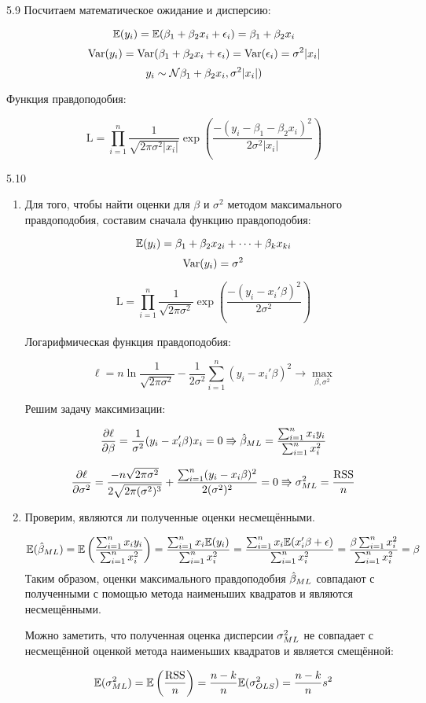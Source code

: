 \protect \hypertarget {soln:5.9}{}
\begin{solution}{{5.9}}
Посчитаем математическое ожидание и дисперсию:

\[\mathbb{E}(y_i) = \mathbb{E}(\beta_1 + \beta_2x_i + \epsilon_i) = \beta_1 + \beta_2x_i\]
\[\operatorname{Var}(y_i)= \operatorname{Var}(\beta_1 + \beta_2x_i + \epsilon_i) = \operatorname{Var}(\epsilon_i) = \sigma^2|x_i|\]
\[y_i \sim \mathcal{N}\beta_1 + \beta_2x_i, \sigma^2|x_i|)\]

Функция правдоподобия:

\[\text{L} = \prod_{i=1}^{n} \frac{1}{\sqrt{2\pi \sigma^2|x_i|}}\exp\left( \frac{-(y_i - \beta_1 - \beta_2x_i)^2}{2\sigma^2|x_i|}\right) \]
\end{solution}
\protect \hypertarget {soln:5.10}{}
\begin{solution}{{5.10}}
\begin{enumerate}
\item Для того, чтобы найти оценки для $\beta$ и $\sigma^2$ методом максимального правдоподобия, составим сначала функцию правдоподобия:

\[\mathbb{E}(y_i) = \beta_1 + \beta_2x_{2i}+\dots+\beta_kx_{ki}\]
\[\operatorname{Var}(y_i) = \sigma^2\]

\[\text{L} = \prod_{i=1}^{n} \frac{1}{\sqrt{2\pi \sigma^2}}\exp\left( \frac{-(y_i - x_i'\beta)^2}{2\sigma^2}\right) \]

Логарифмическая функция правдоподобия:

\[\ell = n \ln \frac{1}{\sqrt{2\pi\sigma^2}} - \frac{1}{2\sigma^2} \sum_{i=1}^{n} (y_i - x_i'\beta)^2 \to \max_{\beta, \sigma^2}\]

Решим задачу максимизации:

\[\frac{\partial \ell}{\partial\beta} = \frac{1}{\sigma^2}(y_i-x_i'\beta)x_i=0 \Rrightarrow \hat{\beta}_{ML} = \frac{\sum_{i=1}^{n} x_iy_i}{\sum_{i=1}^{n}x_i^2}\]

\[\frac{\partial \ell}{\partial\sigma^2} = \frac{-n\sqrt{2\pi\sigma^2}}{2\sqrt{2\pi(\sigma^2)^3}} + \frac{\sum_{i=1}^{n} (y_i - x_i\beta)^2}{2(\sigma^2)^2}=0 \Rrightarrow \sigma^2_{ML} = \frac{\text{RSS}}{n}\]

\item Проверим, являются ли полученные оценки несмещёнными.

\[\mathbb{E}(\hat{\beta}_{ML}) = \mathbb{E}\left( \frac{\sum_{i=1}^{n} x_iy_i}{\sum_{i=1}^{n}x_i^2}\right) = \frac{\sum_{i=1}^{n} x_i\mathbb{E}(y_i)}{\sum_{i=1}^{n}x_i^2} = \frac{\sum_{i=1}^{n} x_i\mathbb{E}(x_i'\beta + \epsilon)}{\sum_{i=1}^{n}x_i^2} = \frac{\beta\sum_{i=1}^{n} x_i^2}{\sum_{i=1}^{n}x_i^2} = \beta\]
Таким образом, оценки максимального правдоподобия $\hat{\beta}_{ML}$ совпадают с полученными с помощью метода наименьших квадратов и являются несмещёнными.

Можно заметить, что полученная оценка дисперсии $\sigma^2_{ML}$ не совпадает с несмещённой оценкой метода наименьших квадратов и является смещённой:

\[\mathbb{E}(\sigma^2_{ML}) = \mathbb{E}\left( \frac{\text{RSS}}{n}\right) = \frac{n-k}{n}\mathbb{E}(\sigma^2_{OLS}) = \frac{n-k}{n}s^2\]
\end{enumerate}
\end{solution}
